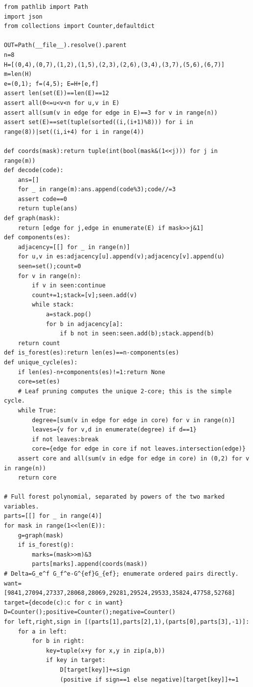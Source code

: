 \documentclass[11pt,a4paper]{article}
\begin{document}
\begin{lstlisting}
from pathlib import Path
import json
from collections import Counter,defaultdict

OUT=Path(__file__).resolve().parent
n=8
H=[(0,4),(0,7),(1,2),(1,5),(2,3),(2,6),(3,4),(3,7),(5,6),(6,7)]
m=len(H)
e=(0,1); f=(4,5); E=H+[e,f]
assert len(set(E))==len(E)==12
assert all(0<=u<v<n for u,v in E)
assert all(sum(v in edge for edge in E)==3 for v in range(n))
assert set(E)==set(tuple(sorted((i,(i+1)%8))) for i in range(8))|set((i,i+4) for i in range(4))

def coords(mask):return tuple(int(bool(mask&(1<<j))) for j in range(m))
def decode(code):
    ans=[]
    for _ in range(m):ans.append(code%3);code//=3
    assert code==0
    return tuple(ans)
def graph(mask):
    return [edge for j,edge in enumerate(E) if mask>>j&1]
def components(es):
    adjacency=[[] for _ in range(n)]
    for u,v in es:adjacency[u].append(v);adjacency[v].append(u)
    seen=set();count=0
    for v in range(n):
        if v in seen:continue
        count+=1;stack=[v];seen.add(v)
        while stack:
            a=stack.pop()
            for b in adjacency[a]:
                if b not in seen:seen.add(b);stack.append(b)
    return count
def is_forest(es):return len(es)==n-components(es)
def unique_cycle(es):
    if len(es)-n+components(es)!=1:return None
    core=set(es)
    # Leaf pruning computes the unique 2-core; this is the simple cycle.
    while True:
        degree=[sum(v in edge for edge in core) for v in range(n)]
        leaves={v for v,d in enumerate(degree) if d==1}
        if not leaves:break
        core={edge for edge in core if not leaves.intersection(edge)}
    assert core and all(sum(v in edge for edge in core) in (0,2) for v in range(n))
    return core

# Full forest polynomial, separated by powers of the two marked variables.
parts=[[] for _ in range(4)]
for mask in range(1<<len(E)):
    g=graph(mask)
    if is_forest(g):
        marks=(mask>>m)&3
        parts[marks].append(coords(mask))
# Delta=G_e^f G_f^e-G^{ef}G_{ef}; enumerate ordered pairs directly.
want=[9841,27094,27337,28068,28069,29281,29524,29533,35824,47758,52768]
target={decode(c):c for c in want}
D=Counter();positive=Counter();negative=Counter()
for left,right,sign in [(parts[1],parts[2],1),(parts[0],parts[3],-1)]:
    for a in left:
        for b in right:
            key=tuple(x+y for x,y in zip(a,b))
            if key in target:
                D[target[key]]+=sign
                (positive if sign==1 else negative)[target[key]]+=1


\end{lstlisting}
\end{document}
